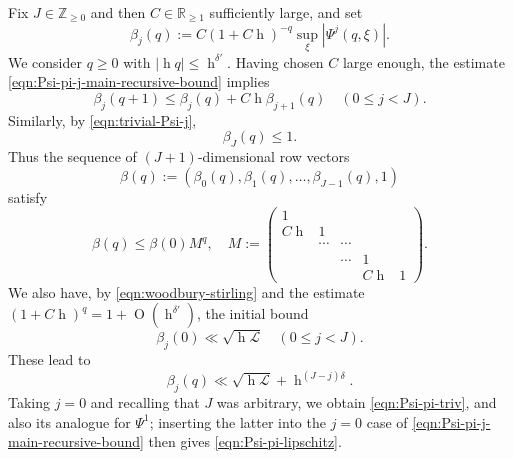 \documentclass[reqno,10pt]{amsart}
\theoremstyle{plain} %
\theoremstyle{definition}
\theoremstyle{plain} %
\theoremstyle{remark}
\theoremstyle{itplain} %
\theoremstyle{remark} %
\renewcommand{\geq}{\geqslant}
\renewcommand{\leq}{\leqslant}
\numberwithin{equation}{section}
\def\O{\operatorname{O}}
\DeclareMathOperator{\h}{h}
\begin{document}
Fix $J \in \mathbb{Z}_{\geq 0}$ and then $C \in \mathbb{R}_{\geq 1}$ sufficiently large, and set
\[
  \beta_j(q) := C (1 + C \h)^{-q} \sup_{\xi} |\Psi^j(q,\xi)|.
\]
We consider $q \geq 0$ with $|\h q| \leq \h^{\delta '}$.  Having chosen $C$ large enough, the estimate \eqref{eqn:Psi-pi-j-main-recursive-bound} implies
\begin{equation}\label{eqn:recursion-for-beta-j}
  \beta_j(q + 1) \leq \beta_j(q)
  + C \h \beta_{j+1}(q)
  \quad (0 \leq j < J).
\end{equation}
Similarly, by \eqref{eqn:trivial-Psi-j},
\begin{equation*}
  \beta_J(q) \leq 1.
\end{equation*}
Thus the sequence of $(J+1)$-dimensional row vectors
\[\beta(q) := (\beta_0(q), \beta_1(q), \dotsc, \beta_{J-1}(q), 1)\]
satisfy
\[\beta(q) \leq \beta(0) M^q,
  \quad M := \begin{pmatrix}
    1    &        &        &      &   \\
    C \h & 1      &        &          \\
    & \dotsb & \dotsb &      &   \\
    &        & \dotsb & 1    &   \\
    & & & C \h & 1
  \end{pmatrix}.
\]
We also have, by \eqref{eqn:woodbury-stirling} and the estimate $(1 + C \h)^q = 1 + \O(\h^{\delta '})$, the initial bound
\begin{equation*}
  \beta_j(0) \ll \sqrt{\h \mathcal{L}}
  \quad
  (0 \leq j < J).
\end{equation*}
These lead to
\begin{equation}
  \beta_j(q) \ll \sqrt{\h \mathcal{L} }
  + \h^{(J-j) \delta}.
\end{equation}
Taking $j = 0$ and recalling that $J$ was arbitrary, we obtain \eqref{eqn:Psi-pi-triv}, and also its analogue for $\Psi^1$; inserting the latter into the $j=0$ case of \eqref{eqn:Psi-pi-j-main-recursive-bound} then gives \eqref{eqn:Psi-pi-lipschitz}.
\end{document}
